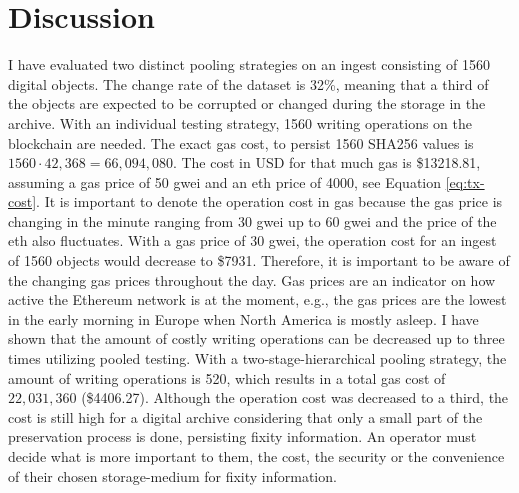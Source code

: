 \documentclass[final]{vutinfth}
\begin{document}
 \chapter{Discussion}
I have evaluated two distinct pooling strategies on an ingest consisting of 1560 digital objects. The change rate of the dataset is 32\%, meaning that a third of the objects are expected to be corrupted or changed during the storage in the archive. With an individual testing strategy, 1560 writing operations on the blockchain are needed. The exact gas cost, to persist 1560 SHA256 values is $1560 \cdot 42,368 = 66,094,080$. The cost in USD for that much gas is \$13218.81, assuming a gas price of 50 \acrlong{gwei} and an \acrlong{eth} price of 4000, see Equation \ref{eq:tx-cost}. It is important to denote the operation cost in gas because the gas price is changing in the minute ranging from 30 \acrlong{gwei} up to 60 \acrlong{gwei} and the price of the \acrlong{eth} also fluctuates. With a gas price of 30 \acrlong{gwei}, the operation cost for an ingest of 1560 objects would decrease to \$7931.
Therefore, it is important to be aware of the changing gas prices throughout the day. Gas prices are an indicator on how active the Ethereum network is at the moment, e.g., the gas prices are the lowest in the early morning in Europe when North America is mostly asleep.
I have shown that the amount of costly writing operations can be decreased up to three times utilizing pooled testing. With a two-stage-hierarchical pooling strategy, the amount of writing operations is 520, which results in a total gas cost of $22,031,360$ (\$4406.27).
Although the operation cost was decreased to a third, the cost is still high for a digital archive considering that only a small part of the preservation process is done, persisting fixity information. An operator must decide what is more important to them, the cost, the security or the convenience of their chosen storage-medium for fixity information. 
\end{document}
